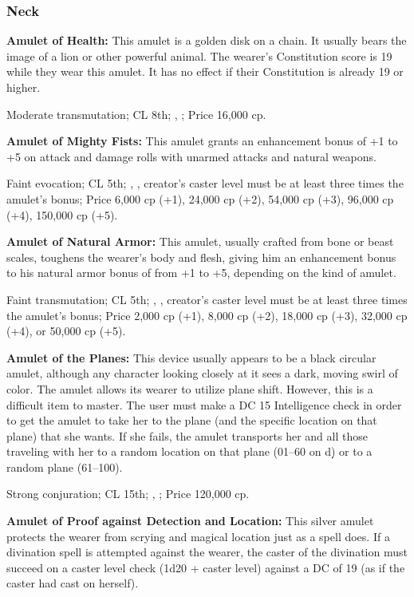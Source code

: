 \subsubsection{Neck}

\textbf{Amulet of Health:} This amulet is a golden disk on a chain. It usually bears the image of a lion or other powerful animal. The wearer's Constitution score is 19 while they wear this amulet. It has no effect if their Constitution is already 19 or higher.

Moderate transmutation; CL 8th; , ; Price 16,000 cp.


\textbf{Amulet of Mighty Fists:} This amulet grants an enhancement bonus of +1 to +5 on attack and damage rolls with unarmed attacks and natural weapons.

Faint evocation; CL 5th; , , creator's caster level must be at least three times the amulet's bonus; Price 6,000 cp (+1), 24,000 cp (+2), 54,000 cp (+3), 96,000 cp (+4), 150,000 cp (+5).


\textbf{Amulet of Natural Armor:} This amulet, usually crafted from bone or beast scales, toughens the wearer's body and flesh, giving him an enhancement bonus to his natural armor bonus of from +1 to +5, depending on the kind of amulet.

Faint transmutation; CL 5th; , , creator's caster level must be at least three times the amulet's bonus; Price 2,000 cp (+1), 8,000 cp (+2), 18,000 cp (+3), 32,000 cp (+4), or 50,000 cp (+5).


\textbf{Amulet of the Planes:} This device usually appears to be a black circular amulet, although any character looking closely at it sees a dark, moving swirl of color. The amulet allows its wearer to utilize plane shift. However, this is a difficult item to master. The user must make a DC 15 Intelligence check in order to get the amulet to take her to the plane (and the specific location on that plane) that she wants. If she fails, the amulet transports her and all those traveling with her to a random location on that plane (01--60 on d\d) or to a random plane (61--100).

Strong conjuration; CL 15th; , ; Price 120,000 cp.


\textbf{Amulet of Proof against Detection and Location:} This silver amulet protects the wearer from scrying and magical location just as a  spell does. If a divination spell is attempted against the wearer, the caster of the divination must succeed on a caster level check (1d20 + caster level) against a DC of 19 (as if the caster had cast  on herself).

